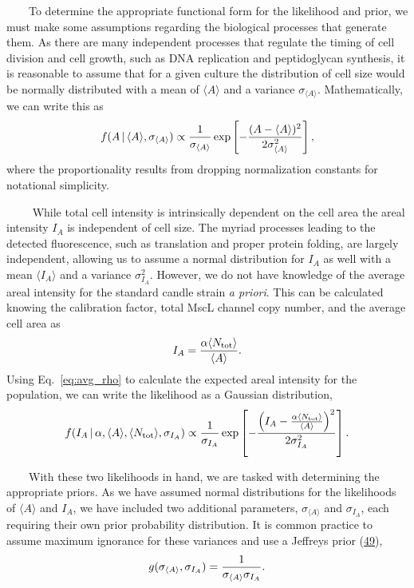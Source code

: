 ~~~~To
determine
the
appropriate
functional
form
for
the
likelihood
and
prior,
we
must
make
some
assumptions
regarding
the
biological
processes
that
generate
them.
As
there
are
many
independent
processes
that
regulate
the
timing
of
cell
division
and
cell
growth,
such
as DNA
replication
and
peptidoglycan
synthesis,
it is
reasonable
to
assume
that
for a
given
culture
the
distribution
of
cell
size
would
be
normally
distributed
with a
mean
of
\(\langle A \rangle\)
and a
variance
\(\sigma_{\langle A \rangle}\).
Mathematically,
we can
write
this
as
\begin{equation}
f(A\,\vert\,\langle A \rangle, \sigma_{\langle A \rangle}) \propto {1 \over \sigma_{\langle A \rangle}}\exp\left[-{(A - \langle A \rangle)^2 \over 2\sigma_{\langle A \rangle}^2}\right],
\label{eq:area_likelihood}\end{equation}
where
the
proportionality
results
from
dropping
normalization
constants
for
notational
simplicity.

~~~~
While
total
cell
intensity
is
intrinsically
dependent
on the
cell
area
the
areal
intensity
\(I_A\)
is
independent
of
cell
size.
The
myriad
processes
leading
to the
detected
fluorescence,
such
as
translation
and
proper
protein
folding,
are
largely
independent,
allowing
us to
assume
a
normal
distribution
for
\(I_A\)
as
well
with a
mean
\(\langle I_A \rangle\)
and a
variance
\(\sigma_{I_A}^2\).
However,
we do
not
have
knowledge
of the
average
areal
intensity
for
the
standard
candle
strain
\emph{a
priori}.
This
can be
calculated
knowing
the
calibration
factor,
total
MscL
channel
copy
number,
and
the
average
cell
area
as
\begin{equation}
I_A =  {\alpha\langle N_\text{tot} \rangle \over \langle A \rangle}.
\label{eq:avg_rho}\end{equation}
Using
Eq.~\ref{eq:avg_rho}
to
calculate
the
expected
areal
intensity
for
the
population,
we can
write
the
likelihood
as a
Gaussian
distribution,
\begin{equation}
f(I_A\,\vert\,\alpha,\langle A \rangle,\langle N_\text{tot} \rangle, \sigma_{I_A}) \propto {1 \over \sigma_{I_A}}\exp\left[-{\left(I_A - {\alpha \langle N_\text{tot} \rangle\over \langle A \rangle}\right)^2 \over 2 \sigma_{I_A}^2}\right].
\label{eq:rho_likelihood}\end{equation}

~~~~With
these
two
likelihoods
in
hand,
we are
tasked
with
determining
the
appropriate
priors.
As we
have
assumed
normal
distributions
for
the
likelihoods
of
\(\langle A \rangle\)
and
\(I_A\),
we
have
included
two
additional
parameters,
\(\sigma_{\langle A \rangle}\)
and
\(\sigma_{I_A}\),
each
requiring
their
own
prior
probability
distribution.
It is
common
practice
to
assume
maximum
ignorance
for
these
variances
and
use a
Jeffreys
prior
(\protect\hyperlink{ref-sivia2006}{49}),
\begin{equation}
g(\sigma_{\langle A \rangle}, \sigma_{I_A}) = {1 \over \sigma_{\langle A \rangle}\sigma_{I_A}}.
\label{eq:jeffreys}\end{equation}

